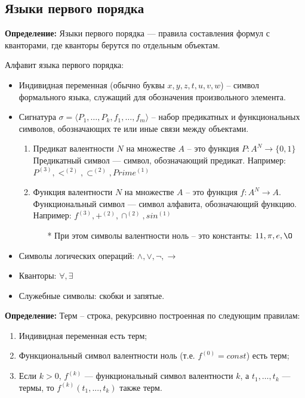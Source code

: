 \subsection{Языки первого порядка}
\textbf{Определение:} Языки первого порядка — правила составления формул с кванторами, где кванторы берутся по отдельным объектам.
\newline \par \noindent Алфавит языка первого порядка:
\begin{itemize}
    \item Индивидная переменная (обычно буквы $x, y, z, t, u, v, w$) -- символ формального языка, служащий для обозначения произвольного элемента.
    \item Сигнатура $\sigma = \langle P_1,\ldots, P_k,f_1,\ldots,f_m \rangle$ -- набор предикатных и функциональных символов, обозначающих те или иные связи между объектами. 
    \begin{enumerate}
        \item Предикат валентности $N$ на множестве $A$ -- это функция $P:A^N\to \{0,1\}$ 
        \newline Предикатный символ — символ, обозначающий предикат. 
        \newline Например: $P^{(3)}, <^{(2)}, \subset ^{(2)}, Prime^{(1)}$
        
        \item Функция валентности $N$ на множестве $A$ -- это функция $f:A^N\to A$.
        \newline Функциональный символ — символ алфавита, обозначающий функцию.
        \newline Например: $f^{(3)}, +^{(2)}, \cap ^{(2)}, sin^{(1)}$
        \begin{itemize}
            \item[*] При этом символы валентности ноль -- это константы: $11, \pi, e, \O$
        \end{itemize}
    \end{enumerate}
    
    \item Символы логических операций: $\land, \lor, \neg, \to$
    \item Кванторы: $\forall, \exists$
    \item Служебные символы: скобки и запятые.
\end{itemize}

\textbf{Определение:} Терм -- строка, рекурсивно построенная по следующим правилам:
\begin{enumerate}
    \item Индивидная переменная есть терм;
    \item Функциональный символ валентности ноль (т.е. $f^{(0)}=const$) есть терм;
    \item Если $k > 0$, $f^{(k)}$ — функциональный символ валентности $k$, а $t_1,\ldots,t_k$ — термы, то $f^{(k)}(t_1,...,t_k)$ также терм.
\end{enumerate}

